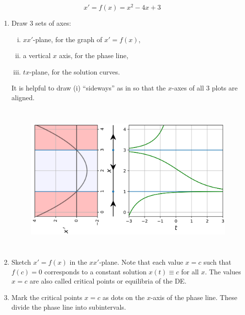 \documentclass[12pt]{book}
\begin{document}
\begin{example}\label{Autoeq:sketching auto}
\begin{equation}
    x' = f(x)= x^2-4x+3
\end{equation}

\begin{enumerate}[Step 1)]
\item Draw 3 sets of axes:
\begin{enumerate}[(i)]
    \item $xx'$-plane, for the graph of $x' = f(x)$,
    \item a vertical $x$ axis, for the phase line,
    \item $tx$-plane, for the solution curves.
\end{enumerate}
It is helpful to draw (i) ``sideways'' as in  so that the $x$-axes 
of all 3 plots are aligned.

\begin{figure}[h!t]


\centering
\includegraphics[width=6.0in, height=3.0in]{additional_figures/first_order_extra_figure_longer_time_update_202001.png}
\caption{}
\label{logisticredrawnjr}

\end{figure}

\item Sketch $x' = f(x)$ in the $xx'$-plane. Note that each value $x=c$ such that $f(c)=0$ corresponds to a constant solution 
$x(t)\equiv c$ for all $x$.
The values $x=c$ are also called  critical points or equilibria of the DE.

\item Mark the critical points $x = c$ as dots on the $x$-axis of the phase line.
These divide the phase line into subintervals.


\end{enumerate}
\end{example}
\end{document}
